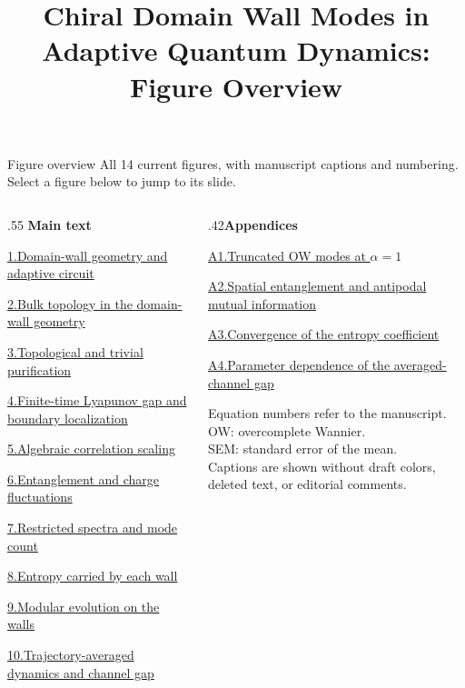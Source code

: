 \documentclass[12pt]{beamer}
\title{Chiral Domain Wall Modes in Adaptive Quantum Dynamics: Figure Overview}
\begin{document}
\begin{frame}[label=overview]{Figure overview}
\vspace{5mm}
All 14 current figures, with manuscript captions and numbering.\\
Select a figure below to jump to its slide.
\vspace{5mm}
\begin{columns}[T,onlytextwidth]
\begin{column}{.55\textwidth}
\textbf{Main text}\par\medskip
\fontsize{12}{18}\selectfont

\hyperlink{fig1}{1.\enspace Domain-wall geometry and adaptive circuit}\par
\hyperlink{fig2}{2.\enspace Bulk topology in the domain-wall geometry}\par
\hyperlink{fig3}{3.\enspace Topological and trivial purification}\par
\hyperlink{fig4}{4.\enspace Finite-time Lyapunov gap and boundary localization}\par
\hyperlink{fig5}{5.\enspace Algebraic correlation scaling}\par
\hyperlink{fig6}{6.\enspace Entanglement and charge fluctuations}\par
\hyperlink{fig7}{7.\enspace Restricted spectra and mode count}\par
\hyperlink{fig8}{8.\enspace Entropy carried by each wall}\par
\hyperlink{fig9}{9.\enspace Modular evolution on the walls}\par
\hyperlink{fig10}{10.\enspace Trajectory-averaged dynamics and channel gap}\par
\end{column}\begin{column}{.42\textwidth}\textbf{Appendices}\par\medskip\fontsize{12}{18}\selectfont
\hyperlink{figA1}{A1.\enspace Truncated OW modes at $\alpha=1$}\par
\hyperlink{figA2}{A2.\enspace Spatial entanglement and antipodal mutual information}\par
\hyperlink{figA3}{A3.\enspace Convergence of the entropy coefficient}\par
\hyperlink{figA4}{A4.\enspace Parameter dependence of the averaged-channel gap}\par
\vspace{8mm}
\color{muted}\fontsize{10}{14}\selectfont
Equation numbers refer to the manuscript.\\[2mm]
OW: overcomplete Wannier.\\
SEM: standard error of the mean.\\[2mm]
Captions are shown without draft colors, deleted text, or editorial comments.
\end{column}\end{columns}
\end{frame}
\end{document}
